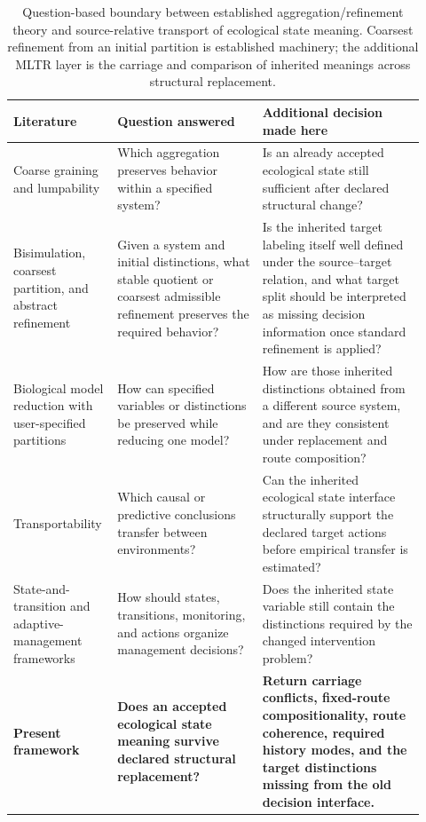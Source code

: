 \documentclass[11pt]{article}
\begin{document}
\begin{table}[t]
\centering
\begin{tabular}{p{0.20\linewidth}p{0.34\linewidth}p{0.38\linewidth}}
\toprule
Literature & Question answered & Additional decision made here \\
\midrule
Coarse graining and lumpability & Which aggregation preserves behavior within a specified system? & Is an already accepted ecological state still sufficient after declared structural change? \\
Bisimulation, coarsest partition, and abstract refinement & Given a system and initial distinctions, what stable quotient or coarsest admissible refinement preserves the required behavior? & Is the inherited target labeling itself well defined under the source--target relation, and what target split should be interpreted as missing decision information once standard refinement is applied? \\
Biological model reduction with user-specified partitions & How can specified variables or distinctions be preserved while reducing one model? & How are those inherited distinctions obtained from a different source system, and are they consistent under replacement and route composition? \\
Transportability & Which causal or predictive conclusions transfer between environments? & Can the inherited ecological state interface structurally support the declared target actions before empirical transfer is estimated? \\
State-and-transition and adaptive-management frameworks & How should states, transitions, monitoring, and actions organize management decisions? & Does the inherited state variable still contain the distinctions required by the changed intervention problem? \\
\textbf{Present framework} & \textbf{Does an accepted ecological state meaning survive declared structural replacement?} & \textbf{Return carriage conflicts, fixed-route compositionality, route coherence, required history modes, and the target distinctions missing from the old decision interface.} \\
\bottomrule
\end{tabular}
\caption{Question-based boundary between established aggregation/refinement theory and source-relative transport of ecological state meaning. Coarsest refinement from an initial partition is established machinery; the additional MLTR layer is the carriage and comparison of inherited meanings across structural replacement.}
\label{tab:boundaries}
\end{table}
\end{document}
